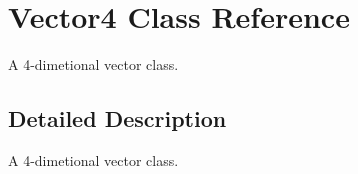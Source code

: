 \hypertarget{class_vector4}{\section{Vector4 Class Reference}
\label{class_vector4}
}


A 4-\/dimetional vector class.  




\subsection{Detailed Description}
A 4-\/dimetional vector class. 